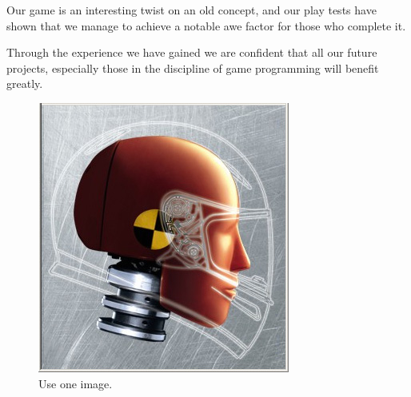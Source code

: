 \documentclass[sponsored]{acmsiggraph}
\begin{document}
Our game is an interesting twist on an old concept, and our play tests have shown that we manage to achieve a notable awe factor for those who complete it.

Through the experience we have gained we are confident that all our future projects, especially those in the discipline of game programming will benefit greatly.



\begin{figure}[t]
    \centering
    \includegraphics[width=0.3\linewidth]{images/Dummy}
    \caption{\label{fig:OneImage} Use one image.}
\end{figure}
\end{document}
